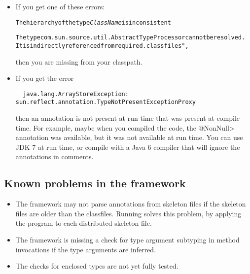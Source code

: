 \begin{itemize}
\item
If you get one of these errors:

\begin{alltt}
The hierarchy of the type \emph{ClassName} is inconsistent

The type com.sun.source.util.AbstractTypeProcessor cannot be resolved.
  It is indirectly referenced from required .class files", 
\end{alltt}

\noindent
then you are missing  from your classpath.

\item
If you get the error

\begin{Verbatim}
  java.lang.ArrayStoreException: sun.reflect.annotation.TypeNotPresentExceptionProxy
\end{Verbatim}

\noindent
then an annotation is not present at run time that was present at compile
time.  For example, maybe when you compiled the code, the \<@NonNull>
annotation was available, but it was not available at run time.
You can use JDK 7 at run time, or compile
with a Java 6 compiler that will ignore the annotations in comments.

\end{itemize}


\subsection{Known problems in the framework\label{known-problems}}

\begin{itemize}

\item
  The framework may not parse annotations from skeleton files if the
  skeleton files are older than the classfiles.  Running  solves this problem, by applying the 
   program to each distributed skeleton file.

\item The framework is missing a check for type argument subtyping in
  method invocations if the type arguments are inferred.

\item The checks for enclosed types are not yet fully tested.

\end{itemize}

